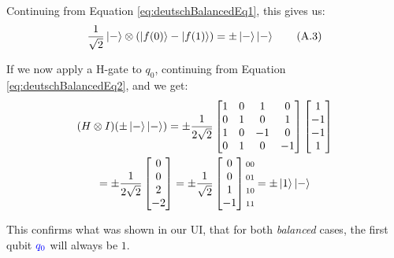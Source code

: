 \documentclass[conference]{IEEEtran}
\begin{document}
\begin{appendices}
Continuing from Equation \ref{eq:deutschBalancedEq1}, this gives us:
\begin{equation*}
    \frac{1}{\sqrt{2}}\ket{-} \otimes (\ket{f(0)} - \ket{f(1)})
    =
    \pm \ket{-}\ket{-} \tag{A.3} \label{eq:deutschBalancedEq2}
\end{equation*}

If we now apply a H-gate to $q_0$, continuing from Equation \ref{eq:deutschBalancedEq2}, and we get:
\begin{multline*}
    (H \otimes I)(\pm \ket{-}\ket{-})
=
\pm
\frac{1}{2\sqrt{2}}
\begin{bmatrix}
1 & 0 & 1 & 0 \\
0 & 1 & 0 & 1 \\
1 & 0 & -1 & 0 \\
0 & 1 & 0 & -1 \\
\end{bmatrix}
\begin{bmatrix}
1 \\
-1 \\
-1 \\
1 \\
\end{bmatrix} \\
=
\pm
\frac{1}{2\sqrt{2}}
\begin{bmatrix}
0 \\
0 \\
2 \\
-2 \\
\end{bmatrix}
=
\pm
\frac{1}{\sqrt{2}}
\begin{bmatrix}
0 \\
0 \\
1 \\
-1 \\
\end{bmatrix}
\begin{matrix}
{\scriptstyle 00} \\
{\scriptstyle 01} \\
{\scriptstyle 10} \\
{\scriptstyle 11} \\
\end{matrix}
=
\pm\ket{1}\ket{-}
\end{multline*}

This confirms what was shown in our UI, that for both \textit{balanced} cases,
the first qubit $\textcolor{blue}{q_0}$ will always be $1$.



\clearpage


\end{appendices}
\end{document}
